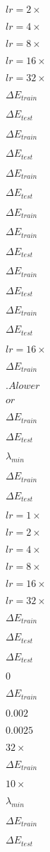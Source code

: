 $lr=2\times$

$lr=4\times$

$lr=8\times$

$lr=16\times$

$lr=32\times$

$\Delta E_{train}$

$\Delta E_{test}$

$\Delta E_{train}$

$\Delta E_{test}$

$\Delta E_{train}$

$\Delta E_{test}$

$\Delta E_{train}$

$\Delta E_{train}$

$\Delta E_{test}$

$\Delta E_{train}$

$\Delta E_{test}$

$\Delta E_{train}$

$\Delta E_{test}$

$lr=16\times$

$\Delta E_{train}$

$. A lower $

$ or $

$\Delta E_{train}$

$\Delta E_{test}$

$\lambda_{min}$

$\Delta E_{train}$

$\Delta E_{test}$

$lr=1\times$

$lr=2\times$

$lr=4\times$

$lr=8\times$

$lr=16\times$

$lr=32\times$

$\Delta E_{train}$

$\Delta E_{test}$

$\Delta E_{test}$

$0$

$\Delta E_{train}$

$0.002$

$0.0025$

$32\times$

$\Delta E_{train}$

$10\times$

$\lambda_{min}$

$\Delta E_{train}$

$\Delta E_{test}$

